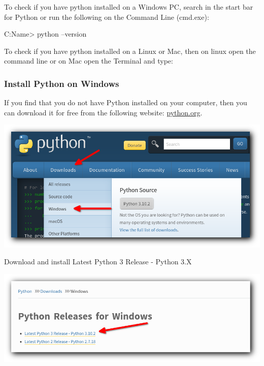 \documentclass[12pt,a4paper]{article}
\begin{document}
To check if you have python installed on a Windows PC, search in the start bar
for Python or run the following on the Command Line (cmd.exe):

\begin{vercode}
C:\Users\Your Name> python --version
\end{vercode}

To check if you have python installed on a Linux or Mac, then on linux open the
command line or on Mac open the Terminal and type:


\subsubsection{Install Python on Windows}

If you find that you do not have Python installed on your computer, then you
can download it for free from the following website:
\underline{\href{https://www.python.org/}{python.org}}.

\begin{center}
	\includegraphics[width=.9\textwidth]{shots/installation/python-page.png}
\end{center}

Download and install \textsf{Latest Python 3 Release - Python 3.X}

\begin{center}
	\includegraphics[width=.9\textwidth]{shots/installation/python-version.png}
\end{center}
\end{document}
